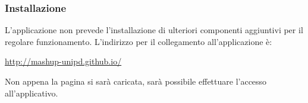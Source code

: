 		\subsubsection{Installazione} %
		\label{sec:installazione}
			L'applicazione non prevede l'installazione di ulteriori componenti aggiuntivi per il regolare funzionamento.
			L'indirizzo per il collegamento all'applicazione è:\newline
			\begin{center}
				\url{http://mashup-unipd.github.io/}
			\end{center}
			Non appena la pagina si sarà caricata, sarà possibile effettuare l'accesso all'applicativo.



